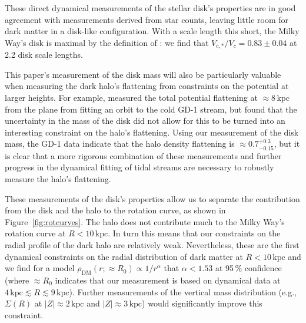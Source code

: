 \documentclass{emulateapj}
\newcommand{\eg}{e.g.}
\renewcommand{\figurename}{Figure}
\newcommand{\kpc}{\ensuremath{\,\mathrm{kpc}}}
\begin{document}
These direct dynamical measurements of the stellar disk's properties
are in good agreement with measurements derived from star counts,
leaving little room for dark matter in a disk-like configuration. With
a scale length this short, the Milky Way's disk is maximal by the
definition of \citet{Sackett97a}: we find that $V_{c,*} / V_c =
0.83\pm0.04$ at 2.2 disk scale lengths.

This paper's measurement of the disk mass will also be particularly
valuable when measuring the dark halo's flattening from constraints on
the potential at larger heights. For example, \citet{Koposov10a}
measured the total potential flattening at $\approx8\kpc$ from the
plane from fitting an orbit to the cold GD-1 stream, but found that
the uncertainty in the mass of the disk did not allow for this to be
turned into an interesting constraint on the halo's flattening. Using
our measurement of the disk mass, the GD-1 data indicate that the halo
density flattening is $\approx 0.7^{+0.3}_{-0.15}$, but it is clear
that a more rigorous combination of these measurements and further
progress in the dynamical fitting of tidal streams
\citep[\eg,][]{Sanders13a} are necessary to robustly measure the
halo's flattening.

These measurements of the disk's properties allow us to separate the
contribution from the disk and the halo to the rotation curve, as
shown in \figurename~\ref{fig:rotcurves}. The halo does not contribute
much to the Milky Way's rotation curve at $R < 10\kpc$. In turn this
means that our constraints on the radial profile of the dark halo are
relatively weak. Nevertheless, these are the first dynamical
constraints on the radial distribution of dark matter at $R < 10\kpc$
and we find for a model $\rho_{\mathrm{DM}} (r;\approx R_0) \propto 1
/ r^{\alpha}$ that $\alpha < 1.53$ at 95\,\% confidence (where
$\approx R_0$ indicates that our measurement is based on dynamical
data at $4\kpc\lesssim R \lesssim 9\kpc$). Further measurements of the
vertical mass distribution (\eg, $\Sigma(R)$ at $|Z| \approx2\kpc$ and
$|Z| \approx3\kpc$) would significantly improve this constraint.
\end{document}
